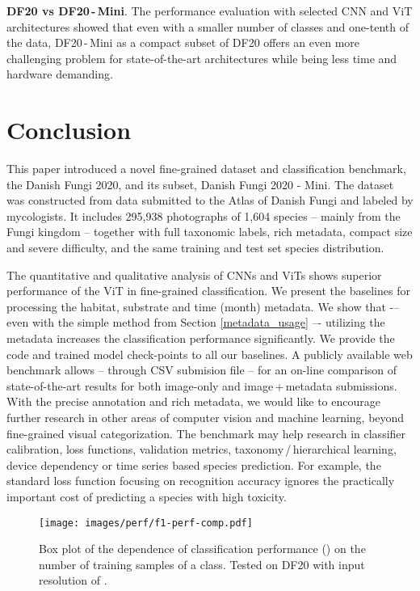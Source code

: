 \documentclass[10pt,twocolumn,letterpaper]{article}
\begin{document}
\textbf{DF20 vs DF20\,-\,Mini}. The performance evaluation with selected CNN and ViT architectures showed that even with a smaller number of classes and one-tenth of the data, DF20\,-\,Mini as a compact subset of DF20 offers an even more challenging problem for state-of-the-art architectures while being less time and hardware demanding.


\section{Conclusion}

This paper introduced a novel fine-grained dataset and classification benchmark, the Danish Fungi 2020, and its subset, Danish Fungi 2020 - Mini. 
The dataset was constructed from data submitted to the Atlas of Danish Fungi and labeled by mycologists. It includes 295,938 photographs of 1,604 species -- mainly from the Fungi kingdom -- together with full taxonomic labels, rich metadata, compact size and severe difficulty, and the same training and test set species distribution.

The quantitative and qualitative analysis of CNNs and ViTs shows superior performance of the ViT in fine-grained classification. We present the baselines for processing the habitat, substrate and time (month) metadata. We show that -– even with the simple method from Section \ref{metadata_usage} –- utilizing the metadata increases the classification performance significantly. We provide the code and trained model check-points to all our baselines. 
A publicly available web benchmark allows -- through CSV submision file -- for an on-line comparison of state-of-the-art results for both image-only and image\,+\,metadata submissions. With the precise annotation and rich metadata, we would like to encourage further research in other areas of computer vision and machine learning, beyond fine-grained visual categorization. The benchmark may help research in classifier calibration, loss functions, validation metrics, taxonomy\,/\,hierarchical learning, device dependency or time series based species prediction. For example, the standard loss function focusing on recognition accuracy ignores the practically important cost of predicting a species with high toxicity. 

\begin{figure}[t!]
\begin{center}
\texttt{[image: images/perf/f1-perf-comp.pdf]}
\caption{Box plot of the dependence of classification performance () on the number of training samples of a class. Tested on DF20 with input resolution of .}
\label{fig:perf_comp}
\end{center}
\end{figure}








{\small


}
\end{document}
